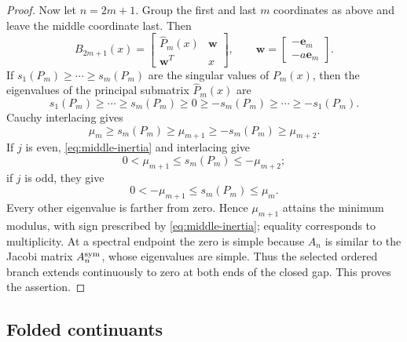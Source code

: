 \documentclass[preprints,article,accept,oneauthor]{Definitions/mdpi}
\numberwithin{equation}{section}
\theoremstyle{mdpi}
\theoremstyle{definition}
\begin{document}
\begin{proof}
Now let \(n=2m+1\).  Group the first and last \(m\) coordinates as
above and leave the middle coordinate last.  Then
\begin{equation}\label{eq:odd-dilation}
 B_{2m+1}(x)=
 \begin{bmatrix}\widehat P_m(x)&\boldsymbol w\\\boldsymbol w^T&x\end{bmatrix},
 \qquad
 \boldsymbol w=\begin{bmatrix}-\mathbf e_m\\-a\mathbf e_m\end{bmatrix}.
\end{equation}
If \(s_1(P_m)\geq\cdots\geq s_m(P_m)\) are the singular values of
\(P_m(x)\), then the eigenvalues of the principal submatrix
\(\widehat P_m(x)\) are
\[
 s_1(P_m)\geq\cdots\geq s_m(P_m)\geq0\geq
 -s_m(P_m)\geq\cdots\geq-s_1(P_m).
\]
Cauchy interlacing gives
\[
 \mu_m\geq s_m(P_m)\geq\mu_{m+1}
 \geq-s_m(P_m)\geq\mu_{m+2}.
\]
If \(j\) is even, \eqref{eq:middle-inertia} and interlacing give
\[
 0<\mu_{m+1}\leq s_m(P_m)\leq-\mu_{m+2};
\]
if \(j\) is odd, they give
\[
 0<-\mu_{m+1}\leq s_m(P_m)\leq\mu_m.
\]
Every other eigenvalue is farther from zero.  Hence
\(\mu_{m+1}\) attains the minimum modulus, with sign prescribed by
\eqref{eq:middle-inertia}; equality corresponds to multiplicity.  At a
spectral endpoint the zero is simple because \(A_n\) is similar to the
Jacobi matrix \(A_n^{\rm sym}\), whose eigenvalues are simple.  Thus the selected
ordered branch extends continuously to zero at both ends of the closed
gap.  This proves the assertion.
\end{proof}

\subsection{Folded continuants}
\label{subsec:folded-continuants}
\end{document}
